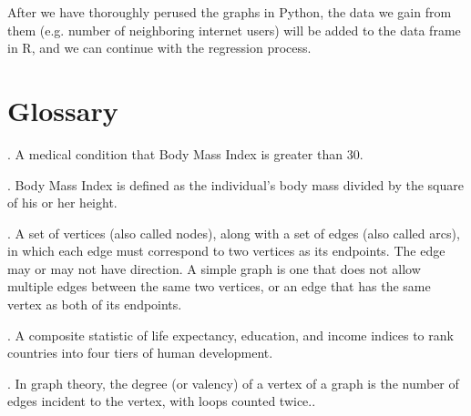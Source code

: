 \documentclass[oneside,12pt]{report}
\begin{document}
After we have thoroughly perused the graphs in Python, the data we gain from them (e.g. number of neighboring internet users) will be added to the data frame in R, and we can continue with the regression process.



\appendix
{}


\chapter{Glossary}\label{Glossary}

\vspace{12pt}

\vspace{8pt}
. A medical condition that Body Mass Index is greater than 30.

\vspace{8pt}
. Body Mass Index is defined as the individual's body mass divided by the square of his or her height.

\vspace{8pt}
. A set of vertices (also called nodes), along with a set of edges (also called arcs), in which each edge must correspond to two vertices as its endpoints. The edge may or may not have direction. A simple graph is one that does not allow multiple edges between the same two vertices, or an edge that has the same vertex as both of its endpoints.

\vspace{8pt}
. A composite statistic of life expectancy, education, and income indices to rank countries into four tiers of human development.

\vspace{8pt} . In graph theory, the degree (or valency) of a vertex of a graph is the number of edges incident to the vertex, with loops counted twice..
\end{document}
